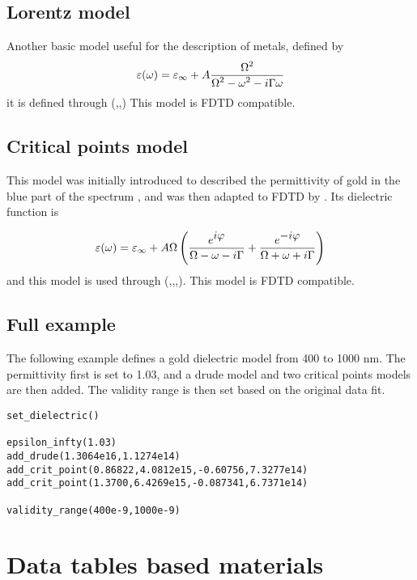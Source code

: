 \subsection{Lorentz model}

Another basic model useful for the description of metals, defined by
\begin{equation}
\varepsilon(\omega)=\varepsilon_\infty+A\frac{\displaystyle \Omega^2}{\displaystyle \Omega^2-\omega^2-i\Gamma\omega}
\end{equation}
it is defined through (,\lft{$\Omega$},\lft{$\Gamma$}) This model is FDTD compatible.

\subsection{Critical points model}

This model was initially introduced to described the permittivity of gold in the blue part of the spectrum \cite{Etchegoin:06}, and was then adapted to FDTD by \cite{Vial:07}. Its dielectric function is
	
\begin{equation}
\varepsilon(\omega)=\varepsilon_\infty+A\Omega\left(\frac{\displaystyle e^{\displaystyle i\varphi}}{\displaystyle \Omega-\omega-i\Gamma}+\frac{\displaystyle e^{\displaystyle -i\varphi}}{\displaystyle \Omega+\omega+i\Gamma}\right)
\end{equation}
and this model is used through (,\lft{$\Omega$},\lft{$\varphi$},\lft{$\Gamma$}). This model is FDTD compatible.

\subsection{Full example}

The following example defines a gold dielectric model from 400 to 1000 nm. The permittivity first is set to 1.03, and a drude model and two critical points models are then added. The validity range is then set based on the original data fit.

\begin{lstlisting}
set_dielectric()

epsilon_infty(1.03)
add_drude(1.3064e16,1.1274e14)
add_crit_point(0.86822,4.0812e15,-0.60756,7.3277e14)
add_crit_point(1.3700,6.4269e15,-0.087341,6.7371e14)

validity_range(400e-9,1000e-9)
\end{lstlisting}

\section{Data tables based materials}


